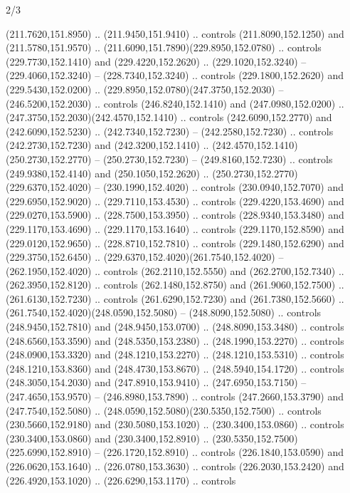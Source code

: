 \begin{flagdescription}{2/3}
\begin{scope}[xshift=0.5\flaglength,yshift=0.5\flagwidth,scale=\flagwidth/259.2]
\begin{scope}[y=0.8pt, x=0.8pt, yscale=-1,shift={(-243,-162)}]
      (211.7620,151.8950) .. (211.9450,151.9410) .. controls (211.8090,152.1250) and
      (211.5780,151.9570) .. (211.6090,151.7890)(229.8950,152.0780) .. controls
      (229.7730,152.1410) and (229.4220,152.2620) .. (229.1020,152.3240) --
      (229.4060,152.3240) -- (228.7340,152.3240) .. controls (229.1800,152.2620) and
      (229.5430,152.0200) .. (229.8950,152.0780)(247.3750,152.2030) --
      (246.5200,152.2030) .. controls (246.8240,152.1410) and (247.0980,152.0200) ..
      (247.3750,152.2030)(242.4570,152.1410) .. controls (242.6090,152.2770) and
      (242.6090,152.5230) .. (242.7340,152.7230) -- (242.2580,152.7230) .. controls
      (242.2730,152.7230) and (242.3200,152.1410) ..
      (242.4570,152.1410)(250.2730,152.2770) -- (250.2730,152.7230) --
      (249.8160,152.7230) .. controls (249.9380,152.4140) and (250.1050,152.2620) ..
      (250.2730,152.2770)(229.6370,152.4020) -- (230.1990,152.4020) .. controls
      (230.0940,152.7070) and (229.6950,152.9020) .. (229.7110,153.4530) .. controls
      (229.4220,153.4690) and (229.0270,153.5900) .. (228.7500,153.3950) .. controls
      (228.9340,153.3480) and (229.1170,153.4690) .. (229.1170,153.1640) .. controls
      (229.1170,152.8590) and (229.0120,152.9650) .. (228.8710,152.7810) .. controls
      (229.1480,152.6290) and (229.3750,152.6450) ..
      (229.6370,152.4020)(261.7540,152.4020) -- (262.1950,152.4020) .. controls
      (262.2110,152.5550) and (262.2700,152.7340) .. (262.3950,152.8120) .. controls
      (262.1480,152.8750) and (261.9060,152.7500) .. (261.6130,152.7230) .. controls
      (261.6290,152.7230) and (261.7380,152.5660) ..
      (261.7540,152.4020)(248.0590,152.5080) -- (248.8090,152.5080) .. controls
      (248.9450,152.7810) and (248.9450,153.0700) .. (248.8090,153.3480) .. controls
      (248.6560,153.3590) and (248.5350,153.2380) .. (248.1990,153.2270) .. controls
      (248.0900,153.3320) and (248.1210,153.2270) .. (248.1210,153.5310) .. controls
      (248.1210,153.8360) and (248.4730,153.8670) .. (248.5940,154.1720) .. controls
      (248.3050,154.2030) and (247.8910,153.9410) .. (247.6950,153.7150) --
      (247.4650,153.9570) -- (246.8980,153.7890) .. controls (247.2660,153.3790) and
      (247.7540,152.5080) .. (248.0590,152.5080)(230.5350,152.7500) .. controls
      (230.5660,152.9180) and (230.5080,153.1020) .. (230.3400,153.0860) .. controls
      (230.3400,153.0860) and (230.3400,152.8910) ..
      (230.5350,152.7500)(225.6990,152.8910) -- (226.1720,152.8910) .. controls
      (226.1840,153.0590) and (226.0620,153.1640) .. (226.0780,153.3630) .. controls
      (226.2030,153.2420) and (226.4920,153.1020) .. (226.6290,153.1170) .. controls

\end{scope}
\end{scope}
\end{flagdescription}
